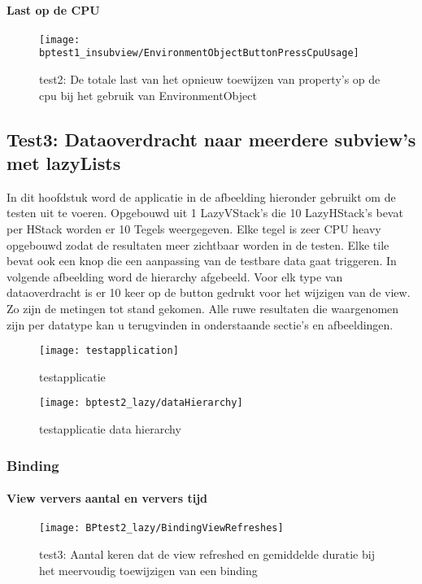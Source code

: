 \paragraph{Last op de CPU}
\begin{figure}[H]
    \centering
    \texttt{[image: bptest1\_insubview/EnvironmentObjectButtonPressCpuUsage]} 
    \caption{test2: De totale last van het opnieuw toewijzen van property's op de cpu bij het gebruik van EnvironmentObject}
    \label{fig:cpuWeightEnvironmentObject1}
\end{figure}

\subsection{Test3: Dataoverdracht naar meerdere subview's met lazyLists}
In dit hoofdstuk word de applicatie in de afbeelding hieronder gebruikt om de testen uit te voeren. Opgebouwd uit 1 LazyVStack's die 10 LazyHStack's bevat per HStack worden er 10 Tegels weergegeven. Elke tegel is zeer CPU heavy opgebouwd zodat de resultaten meer zichtbaar worden in de testen. Elke tile bevat ook een knop die een aanpassing van de testbare data gaat triggeren. In volgende afbeelding word de hierarchy afgebeeld. Voor elk type van dataoverdracht is er 10 keer op de button gedrukt voor het wijzigen van de view. Zo zijn de metingen tot stand gekomen. Alle ruwe resultaten die waargenomen zijn per datatype kan u terugvinden in onderstaande sectie's en afbeeldingen.
\begin{figure}[htbp]
    \centering
    \texttt{[image: testapplication]} 
    \caption{testapplicatie}
    \label{fig:testapplication2}
\end{figure}
\begin{figure}[htbp]
    \centering
    \texttt{[image: bptest2\_lazy/dataHierarchy]} 
    \caption{testapplicatie data hierarchy}
    \label{fig:testapplicationHierarchy2}
\end{figure}
\subsubsection{Binding}
\paragraph{View ververs aantal en ververs tijd}
\begin{figure}[H]
    \centering
    \texttt{[image: BPtest2\_lazy/BindingViewRefreshes]} 
    \caption{test3: Aantal keren dat de view refreshed en gemiddelde duratie bij het meervoudig toewijzigen van een binding}
    \label{fig:viewRefreshesBinding2}
\end{figure}
